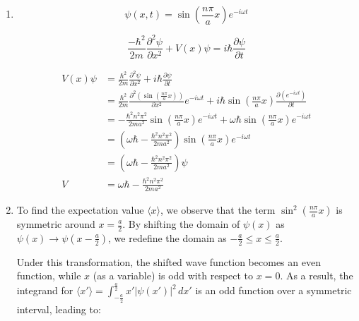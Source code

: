 \documentclass[12pt]{article}
\begin{document}
\begin{enumerate}
    \item
          \[
              \psi(x, t) = \sin \left( \frac{n \pi}{a} x \right) e^{-i \omega t}
          \]



          \[
              \frac{-\hbar^2}{2m}
              \frac{\partial^2 \psi}{\partial x^2} + V(x) \psi = i\hbar \frac{\partial \psi}{\partial t}
          \]

          \begin{equation*}
              \begin{split}
                  V(x) \psi
                    & = \frac{\hbar^2}{2m}
                  \frac{\partial^2 \psi}{\partial x^2}
                  + i\hbar \frac{\partial \psi}{\partial t}                                                                    \\
                    & = \frac{\hbar^2}{2m}
                  \frac{\partial^2 (\sin \left( \frac{n \pi}{a} x \right))}{\partial x^2}e^{-i \omega t}
                  + i\hbar \sin \left( \frac{n \pi}{a} x \right) \frac{\partial (e^{-i \omega t})}{\partial t}                 \\
                    & = - \frac{\hbar^2 n^2 \pi^2}{2ma^2} \sin\left( \frac{n \pi}{a} x \right) e^{-i \omega t}
                  + \omega \hbar \sin \left( \frac{n \pi}{a} x \right) e^{-i \omega t}                                         \\
                    & = (\omega \hbar - \frac{\hbar^2 n^2 \pi^2}{2ma^2}) \sin \left( \frac{n \pi}{a} x \right) e^{-i \omega t} \\
                    & = (\omega \hbar - \frac{\hbar^2 n^2 \pi^2}{2ma^2}) \psi                                                  \\
                  V & = \omega \hbar - \frac{\hbar^2 n^2 \pi^2}{2ma^2}
              \end{split}
          \end{equation*}

    \item

          To find the expectation value \(\langle x \rangle\), we observe that the term \(\sin^2 \left( \frac{n \pi}{a} x \right)\) is symmetric around \(x = \frac{a}{2}\). By shifting the domain of \(\psi(x)\) as \(\psi(x) \rightarrow \psi \left( x - \frac{a}{2} \right)\), we redefine the domain as \(-\frac{a}{2} \leq x \leq \frac{a}{2}\).

          Under this transformation, the shifted wave function becomes an even function, while \(x\) (as a variable) is odd with respect to \(x = 0\). As a result, the integrand for \(\langle x' \rangle = \int_{-\frac{a}{2}}^{\frac{a}{2}} x' |\psi(x')|^2 \, dx'\) is an odd function over a symmetric interval, leading to:


\end{enumerate}
\end{document}
